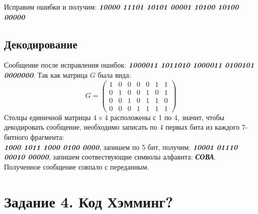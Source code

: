 \documentclass[a5paper, 10pt]{article}
\theoremstyle{definition}
\theoremstyle{plain}
\theoremstyle{remark}
\begin{document}
Исправим ошибки и получим:  \textbf{\textit{10000 11101 10101 00001 10100 10100 00000}}

\subsection{Декодирование}
Сообщение после исправления ошибок:   \textbf{\textit{1000011 1011010 1000011 0100101 0000000}}.
Так как матрица $G$ была вида:
\begin{equation}
G = 
\begin{pmatrix}
1 & 0 & 0 & 0 & 0 & 1 & 1\\
0 & 1 & 0 & 0 & 1 & 0 & 1\\
0 & 0 & 1 & 0 & 1 & 1 & 0\\
0 & 0 & 0 & 1 & 1 & 1 & 1
\end{pmatrix}
\end{equation}
Столцы единичной матрицы $4 \times 4$ расположены с 1 по 4, значит, чтобы декодировать сообщение, необходимо записать по 4 первых бита из каждого 7-битного фрагмента:\\
\textbf{\textit{1000 1011 1000 0100 0000}}, запишем по 5 бит, получим: \textbf{\textit{10001 01110 00010 00000}}, запишем соотвествующие символы алфавита: \textbf{\textit{СОВА}}.\\
Полученное сообщение совпало с переданным.

\section{Задание 4. Код Хэмминг?}
\newpage
\end{document}

